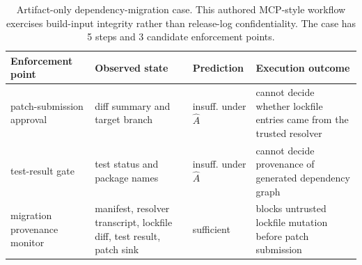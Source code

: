 \begin{table}[t]
  \caption{Artifact-only dependency-migration case. This authored MCP-style
  workflow exercises build-input integrity rather than release-log
  confidentiality. The case has 5 steps and
  3 candidate enforcement points.}
  \label{tab:dependency-migration-case}
  \centering\footnotesize
  \begin{tabular}{@{}p{}p{}p{}p{}@{}}
    \toprule
    Enforcement point & Observed state & Prediction & Execution outcome \\
    \midrule
    patch-submission approval & diff summary and target branch & insuff. under $\widehat{A}$ & cannot decide whether lockfile entries came from the trusted resolver \\
    test-result gate & test status and package names & insuff. under $\widehat{A}$ & cannot decide provenance of generated dependency graph \\
    migration provenance monitor & manifest, resolver transcript, lockfile diff, test result, patch sink & sufficient & blocks untrusted lockfile mutation before patch submission \\
    \bottomrule
  \end{tabular}
\end{table}
